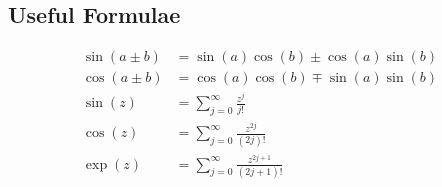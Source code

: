 
\begin{multicols}{2}
\section*{Useful Formulae}
\begin{align*}
    \sin(a\pm b) &= \sin(a)\cos(b)\pm\cos(a)\sin(b) \\
    \cos(a\pm b) &= \cos(a)\cos(b)\mp\sin(a)\sin(b) \\
    \sin(z) &= \sum_{j=0}^\infty \frac{z^j}{j!} \\
    \cos(z) &= \sum_{j=0}^\infty \frac{z^{2j}}{(2j)!} \\
    \exp(z) &= \sum_{j=0}^\infty \frac{z^{2j+1}}{(2j+1)!} \\
\end{align*}
\end{multicols}

\clearpage